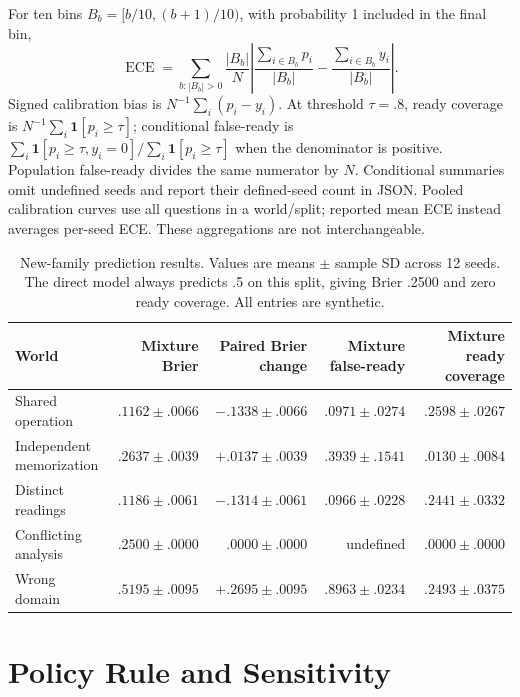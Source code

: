 \documentclass{article}
\newcommand{\ind}{\mathbf{1}}
\begin{document}
For ten bins $B_b=[b/10,(b+1)/10)$, with probability 1 included in the final bin,
\begin{equation}
 \operatorname{ECE}=\sum_{b:|B_b|>0}\frac{|B_b|}{N}
 \left|\frac{\sum_{i\in B_b}p_i}{|B_b|}-\frac{\sum_{i\in B_b}y_i}{|B_b|}\right|.
\end{equation}
Signed calibration bias is $N^{-1}\sum_i(p_i-y_i)$. At threshold $\tau=.8$, ready coverage is $N^{-1}\sum_i\ind[p_i\ge\tau]$; conditional false-ready is $\sum_i\ind[p_i\ge\tau,y_i=0]/\sum_i\ind[p_i\ge\tau]$ when the denominator is positive. Population false-ready divides the same numerator by $N$. Conditional summaries omit undefined seeds and report their defined-seed count in JSON. Pooled calibration curves use all questions in a world/split; reported mean ECE instead averages per-seed ECE. These aggregations are not interchangeable.

\begin{table}[ht]
\caption{New-family prediction results. Values are means $\pm$ sample SD across 12 seeds. The direct model always predicts .5 on this split, giving Brier .2500 and zero ready coverage. All entries are synthetic.}
\centering
\begin{tabular}{lrrrr}
\toprule
World & Mixture Brier & Paired Brier change & Mixture false-ready & Mixture ready coverage \\
\midrule
Shared operation & $.1162\pm.0066$ & $-.1338\pm.0066$ & $.0971\pm.0274$ & $.2598\pm.0267$ \\
Independent memorization & $.2637\pm.0039$ & $+.0137\pm.0039$ & $.3939\pm.1541$ & $.0130\pm.0084$ \\
Distinct readings & $.1186\pm.0061$ & $-.1314\pm.0061$ & $.0966\pm.0228$ & $.2441\pm.0332$ \\
Conflicting analysis & $.2500\pm.0000$ & $.0000\pm.0000$ & undefined & $.0000\pm.0000$ \\
Wrong domain & $.5195\pm.0095$ & $+.2695\pm.0095$ & $.8963\pm.0234$ & $.2493\pm.0375$ \\
\bottomrule
\end{tabular}
\end{table}

\section{Policy Rule and Sensitivity}
\label{app:sensitivity}
\end{document}
